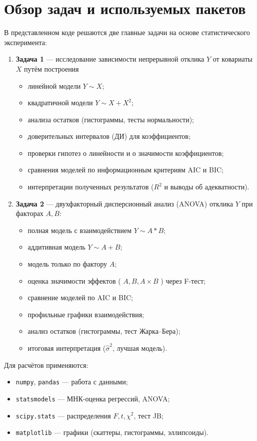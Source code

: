 \documentclass[12pt]{article}
\begin{document}
\section*{Обзор задач и используемых пакетов}

В представленном коде решаются две главные задачи на основе статистического эксперимента:
\begin{enumerate}
  \item \textbf{Задача 1} — исследование зависимости непрерывной отклика \(Y\) от ковариаты \(X\) путём построения
    \begin{itemize}
      \item линейной модели \(Y\sim X\);
      \item квадратичной модели \(Y\sim X+X^{2}\);
      \item анализа остатков (гистограммы, тесты нормальности);
      \item доверительных интервалов (ДИ) для коэффициентов;
      \item проверки гипотез о линейности и о значимости коэффициентов;
      \item сравнения моделей по информационным критериям AIC и BIC;
      \item интерпретации полученных результатов (\(R^{2}\) и выводы об адекватности).
    \end{itemize}

  \item \textbf{Задача 2} — двухфакторный дисперсионный анализ (ANOVA) отклика \(Y\) при факторах \(A,B\):
    \begin{itemize}
      \item полная модель с взаимодействием \(Y\sim A*B\);
      \item аддитивная модель \(Y\sim A+B\);
      \item модель только по фактору \(A\);
      \item оценка значимости эффектов ( \(A,B,A\times B\) ) через F-тест;
      \item сравнение моделей по AIC и BIC;
      \item профильные графики взаимодействия;
      \item анализ остатков (гистограммы, тест Жарка–Бера);
      \item итоговая интерпретация (\(\hat\sigma^{2}\), лучшая модель).
    \end{itemize}
\end{enumerate}

Для расчётов применяются:
\begin{itemize}
  \item \texttt{numpy}, \texttt{pandas} — работа с данными;
  \item \texttt{statsmodels} — МНК-оценка регрессий, ANOVA;
  \item \texttt{scipy.stats} — распределения \(F,t,\chi^{2}\), тест JB;
  \item \texttt{matplotlib} — графики (скаттеры, гистограммы, эллипсоиды).
\end{itemize}
\end{document}
